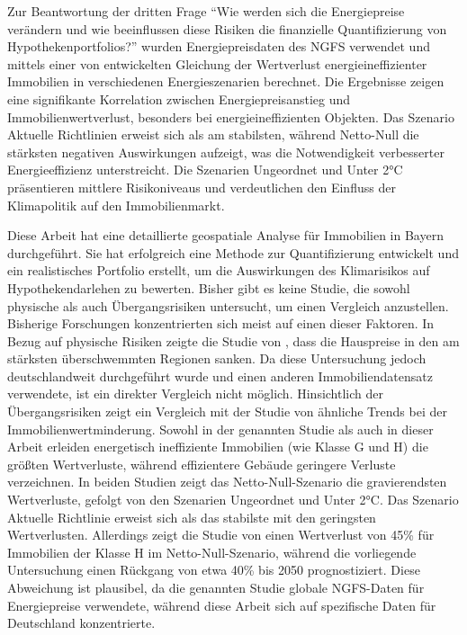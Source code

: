 Zur Beantwortung der dritten Frage \enquote{Wie werden sich die Energiepreise verändern und wie beeinflussen diese Risiken die finanzielle Quantifizierung von Hypothekenportfolios?} wurden Energiepreisdaten des NGFS verwendet und mittels einer von \textcite{tergerman} entwickelten Gleichung der Wertverlust energieineffizienter Immobilien in verschiedenen Energieszenarien berechnet. Die Ergebnisse zeigen eine signifikante Korrelation zwischen Energiepreisanstieg und Immobilienwertverlust, besonders bei energieineffizienten Objekten. Das Szenario Aktuelle Richtlinien erweist sich als am stabilsten, während Netto-Null die stärksten negativen Auswirkungen aufzeigt, was die Notwendigkeit verbesserter Energieeffizienz unterstreicht. Die Szenarien Ungeordnet und Unter 2°C präsentieren mittlere Risikoniveaus und verdeutlichen den Einfluss der Klimapolitik auf den Immobilienmarkt.

Diese Arbeit hat eine detaillierte geospatiale Analyse für Immobilien in Bayern durchgeführt. Sie hat erfolgreich eine Methode zur Quantifizierung entwickelt und ein realistisches Portfolio erstellt, um die Auswirkungen des Klimarisikos auf Hypothekendarlehen zu bewerten.  Bisher gibt es keine Studie, die sowohl physische als auch Übergangsrisiken untersucht, um einen Vergleich anzustellen. Bisherige Forschungen konzentrierten sich meist auf einen dieser Faktoren. In Bezug auf physische Risiken zeigte die Studie von \textcite{moore2022flood}, dass die Hauspreise in den am stärksten überschwemmten Regionen sanken. Da diese Untersuchung jedoch deutschlandweit durchgeführt wurde und einen anderen Immobiliendatensatz verwendete, ist ein direkter Vergleich nicht möglich. Hinsichtlich der Übergangsrisiken zeigt ein Vergleich mit der Studie von \textcite{tergerman} ähnliche Trends bei der Immobilienwertminderung. Sowohl in der genannten Studie als auch in dieser Arbeit erleiden energetisch ineffiziente Immobilien (wie Klasse G und H) die größten Wertverluste, während effizientere Gebäude geringere Verluste verzeichnen. In beiden Studien zeigt das Netto-Null-Szenario die gravierendsten Wertverluste, gefolgt von den Szenarien Ungeordnet und Unter 2°C. Das Szenario Aktuelle Richtlinie erweist sich als das stabilste mit den geringsten Wertverlusten. Allerdings zeigt die Studie von \textcite{tergerman} einen Wertverlust von 45\% für Immobilien der Klasse H im Netto-Null-Szenario, während die vorliegende Untersuchung einen Rückgang von etwa 40\% bis 2050 prognostiziert. Diese Abweichung ist plausibel, da die genannten Studie globale NGFS-Daten für Energiepreise verwendete, während diese Arbeit sich auf spezifische Daten für Deutschland konzentrierte.

